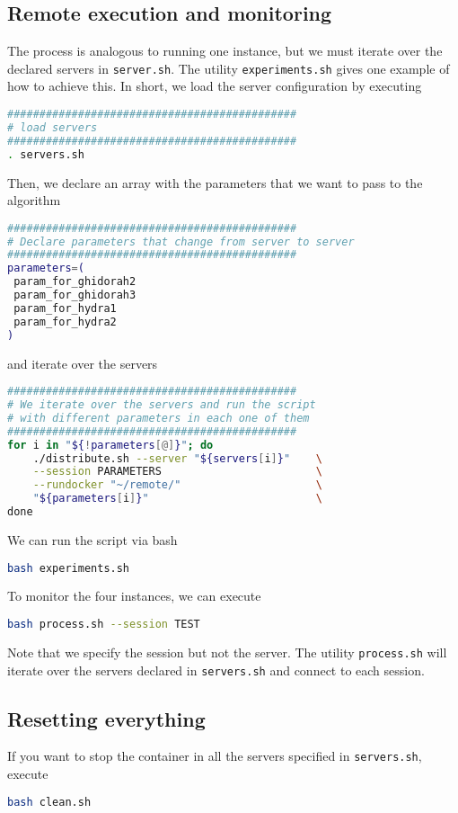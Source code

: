 \documentclass[12pt, letterpaper, onecolumn]{article}
\begin{document}
\subsection{Remote execution and monitoring}

The process is analogous to running one instance, but we must iterate over the declared servers in \texttt{server.sh}. The utility \texttt{experiments.sh} gives one example of how to achieve this. In short, we load the server configuration by executing \begin{lstlisting}[language=Bash]
#############################################
# load servers
#############################################
. servers.sh
\end{lstlisting}  

Then, we declare an array with the parameters that we want to pass to the algorithm \begin{lstlisting}[language=Bash]
#############################################
# Declare parameters that change from server to server
#############################################
parameters=(
 param_for_ghidorah2
 param_for_ghidorah3
 param_for_hydra1
 param_for_hydra2
)
\end{lstlisting}  and iterate over the servers \begin{lstlisting}[language=Bash]
#############################################
# We iterate over the servers and run the script
# with different parameters in each one of them
#############################################
for i in "${!parameters[@]}"; do
	./distribute.sh --server "${servers[i]}"  	\
	--session PARAMETERS      					\
	--rundocker "~/remote/" 					\
	"${parameters[i]}"    						\
done
\end{lstlisting}  

We can run the script via bash \begin{lstlisting}[language=Bash]
bash experiments.sh
\end{lstlisting}  

To monitor the four instances, we can execute \begin{lstlisting}[language=Bash]
bash process.sh --session TEST	
\end{lstlisting} Note that we specify the session but not the server. The utility \texttt{process.sh} will iterate over the servers declared in \texttt{servers.sh} and connect to each session.

\subsection{Resetting everything}

If you want to stop the container in all the servers specified in \texttt{servers.sh}, execute \begin{lstlisting}[language=Bash]
bash clean.sh
\end{lstlisting}  	
\end{document}
